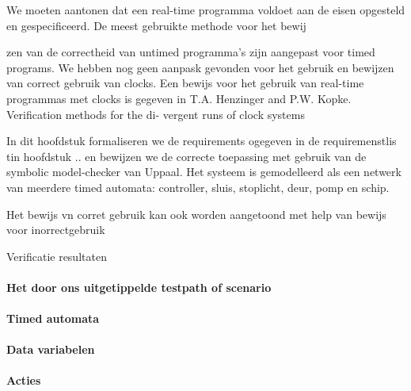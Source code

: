  We moeten aantonen dat een real-time programma voldoet aan de eisen opgesteld en gespecificeerd. De meest gebruikte methode voor het bewij
 
 zen van de correctheid van untimed programma's zijn aangepast voor timed programs.  We hebben nog geen aanpask gevonden voor het gebruik en bewijzen van correct gebruik van clocks.  Een bewijs voor het gebruik van real-time programmas met clocks is gegeven in T.A. Henzinger and P.W. Kopke. Verification methods for the di-
 vergent runs of clock systems
 
 In dit hoofdstuk formaliseren we de requirements ogegeven in de requiremenstlis tin hoofdstuk .. en bewijzen we de correcte toepassing met gebruik van de symbolic model-checker van Uppaal.
 Het systeem is gemodelleerd als een netwerk van meerdere timed automata: controller, sluis, stoplicht, deur, pomp en schip.
 
 Het bewijs vn corret gebruik kan ook worden aangetoond met help van bewijs voor inorrectgebruik
 
 
 Verificatie resultaten
 \paragraph{Het door ons uitgetippelde testpath of scenario}
 
 \paragraph{Timed automata}
 
 
\paragraph{Data variabelen}

\paragraph{Acties}
 

